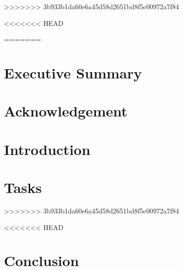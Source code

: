 \documentclass{article}
\begin{document}

>>>>>>> 3b933b1da60e6a45d58d2651bd8f5c00972a7f84

\newpage
\tableofcontents

<<<<<<< HEAD









=======
\section{Executive Summary}


\section{Acknowledgement}


\section{Introduction}














\section{Tasks}
>>>>>>> 3b933b1da60e6a45d58d2651bd8f5c00972a7f84










<<<<<<< HEAD
\section{Conclusion}
\end{document}
